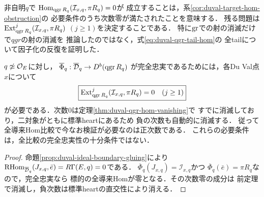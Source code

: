 \begin{remark}
\label{rem:duval-qgr-hom-not-rhom}
非自明$q$で
$\operatorname{Hom}_{\operatorname{qgr} R_q}(\mathcal I_{x,q},\pi R_q)=0$が
成立することは，系\ref{cor:duval-target-hom-obstruction}の
必要条件のうち次数零が満たされたことを意味する．
残る問題は$\operatorname{Ext}^j_{\operatorname{qgr} R_q}(\mathcal I_{x,q},\pi R_q)$
$(j\ge1)$を決定することである．
特に$\operatorname{gr}$での射の消滅だけで$qgr$の射の消滅を
推論したのではなく，式\eqref{eq:duval-qgr-tail-hom}の
全tailについて因子化の反復を証明した．
\end{remark}

\begin{corollary}
\label{cor:duval-target-hom-obstruction}
$q\not\simeq\mathcal O_E$に対し，
$\overline\Phi_q:\overline{\mathcal D}_q\to D^b(\operatorname{qgr} R_q)$
が完全忠実であるためには，各Du Val点$x$について
\[
 \boxed{\operatorname{Ext}^j_{\operatorname{qgr} R_q}(\mathcal I_{x,q},\pi R_q)=0
 \quad(j\ge1)}
\]
が必要である．次数$0$は定理\ref{thm:duval-qgr-hom-vanishing}で
すでに消滅しており，二対象がともに標準heartにあるため
負の次数も自動的に消滅する．
従って全導来Hom比較で今なお検証が必要なのは正次数である．
これらの必要条件は，全比較の完全忠実性の十分条件ではない．
\end{corollary}
\begin{proof}
命題\ref{prop:duval-ideal-boundary-gluing}により
$\operatorname{RHom}_{\overline{\mathcal D}_q}(J_{x,q},\bar e)=
R\Gamma(E,q)=0$である．
$\overline\Phi_q(J_{x,q})=\mathcal I_{x,q}$かつ
$\overline\Phi_q(\bar e)=\pi R_q$なので，完全忠実なら
標的の全導来Homが零となる．その次数零の成分は
前定理で消滅し，負次数は標準heartの直交性により消える．
\end{proof}


